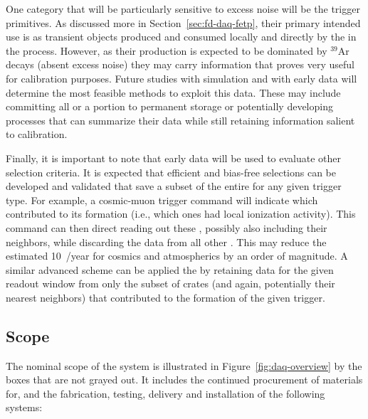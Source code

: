 One category that will be particularly sensitive to excess noise will
be the trigger primitives. 
As discussed more in Section~\ref{sec:fd-daq-fetp}, their primary
intended use is as transient objects produced and consumed locally
and directly by the  in the  process. 
However, as their production is expected to be dominated by $^{39}$Ar
decays (absent excess noise) they may carry information that proves
very useful for calibration purposes. 
Future studies with simulation and with early data will determine 
 the most feasible methods to exploit this data. 
These may include committing all or a portion to permanent storage or
potentially developing processes that can summarize their data while
still retaining information salient to calibration.

Finally, it is important to note that early data will be used to
evaluate other selection criteria. 
It is expected that efficient and bias-free selections can be
developed and validated that save a subset of the entire
 for any given trigger type. 
For example, a cosmic-muon trigger command will indicate which 
contributed to its formation (i.e., which ones had local ionization activity). 
This command can then direct reading out these , possibly also
including their neighbors, while discarding the data from all other
. 
This may reduce the estimated \SI{10}{\PB/year} for cosmics and
atmospherics by an order of magnitude. 
A similar advanced scheme can be applied the 
 by retaining data for the given readout window from
only the subset of  crates (and again, potentially their
nearest neighbors) that contributed to the formation of the given
trigger.



\subsection{Scope}
\label{sec:fd-daq-scope}


The nominal scope of the  system is illustrated in
Figure~\ref{fig:daq-overview} by the boxes that are not grayed out. It 
includes the continued procurement of materials for, and the
fabrication, testing, delivery and installation of the following
systems:

